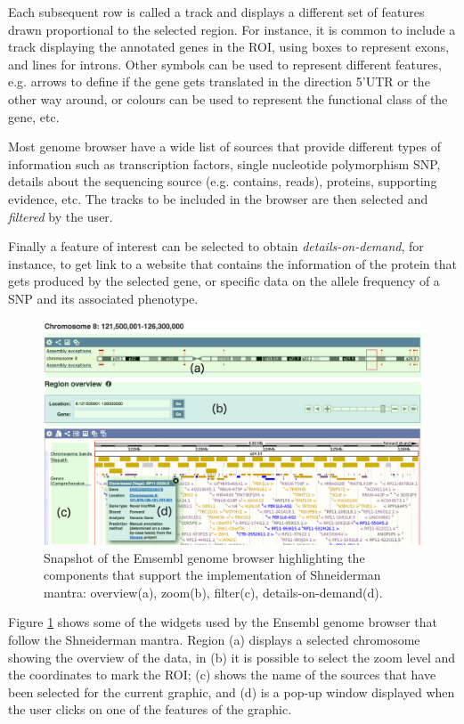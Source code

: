 Each subsequent row is called a track and displays a different set of features drawn proportional to the selected region. For instance, it is common to include a track displaying the annotated genes in the ROI, using boxes to represent exons, and lines for introns. Other symbols can be used to represent different features, e.g. arrows to define if the gene gets translated in the direction 5'UTR or the other way around, or colours can be used to represent the functional class of the gene, etc.

Most genome browser have a wide list of sources that provide different types of information such as transcription factors, single nucleotide polymorphism SNP, details about the sequencing source (e.g. contains, reads), proteins, supporting evidence, etc. The tracks to be included in the browser are then selected and \emph{filtered} by the user. 

Finally a feature of interest can be selected to obtain \emph{details-on-demand}, for instance, to get link to a website that contains the information of the protein that gets produced by the selected gene, or specific data on the allele frequency of a SNP and its associated phenotype.

\begin{figure}  
\centering
\includegraphics[width=\textwidth]{figures/ensembl_snapshot.png}
\caption[Snapshot of the Emsembl genome browser.]{Snapshot of the Emsembl genome browser highlighting the components that support the implementation of Shneiderman mantra: overview(a), zoom(b), filter(c), details-on-demand(d).
\label{fig:ensembl_sn}}
\end{figure}

Figure \ref{fig:ensembl_sn} shows some of the widgets used by the Ensembl genome browser that follow the Shneiderman mantra. Region (a) displays a selected chromosome showing the overview of the data, in (b) it is possible to select the zoom level and the coordinates to mark the ROI; (c) shows the name of the sources that have been selected for the current graphic, and (d) is a pop-up window displayed when the user clicks on one of the features of the graphic.

